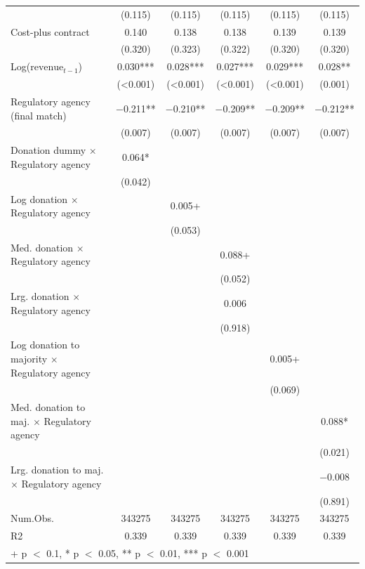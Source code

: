 \begin{table}[H]
{\begin{tabular}[t]{lccccc}
 & (\num{0.115}) & (\num{0.115}) & (\num{0.115}) & (\num{0.115}) & (\num{0.115})\\
Cost-plus contract & \num{0.140} & \num{0.138} & \num{0.138} & \num{0.139} & \num{0.139}\\
 & (\num{0.320}) & (\num{0.323}) & (\num{0.322}) & (\num{0.320}) & (\num{0.320})\\
Log($\text{revenue}_{t-1}$) & \num{0.030}*** & \num{0.028}*** & \num{0.027}*** & \num{0.029}*** & \num{0.028}**\\
 & (\num{<0.001}) & (\num{<0.001}) & (\num{<0.001}) & (\num{<0.001}) & (\num{0.001})\\
Regulatory agency (final match) & \num{-0.211}** & \num{-0.210}** & \num{-0.209}** & \num{-0.209}** & \num{-0.212}**\\
 & (\num{0.007}) & (\num{0.007}) & (\num{0.007}) & (\num{0.007}) & (\num{0.007})\\
Donation dummy $\times$ Regulatory agency & \num{0.064}* &  &  &  & \\
 & (\num{0.042}) &  &  &  & \\
Log donation $\times$ Regulatory agency &  & \num{0.005}+ &  &  & \\
 &  & (\num{0.053}) &  &  & \\
Med. donation $\times$ Regulatory agency &  &  & \num{0.088}+ &  & \\
 &  &  & (\num{0.052}) &  & \\
Lrg. donation $\times$ Regulatory agency &  &  & \num{0.006} &  & \\
 &  &  & (\num{0.918}) &  & \\
Log donation to majority $\times$ Regulatory agency &  &  &  & \num{0.005}+ & \\
 &  &  &  & (\num{0.069}) & \\
Med. donation to maj. $\times$ Regulatory agency &  &  &  &  & \num{0.088}*\\
 &  &  &  &  & (\num{0.021})\\
Lrg. donation to maj. $\times$ Regulatory agency &  &  &  &  & \num{-0.008}\\
 &  &  &  &  & (\num{0.891})\\
\midrule
Num.Obs. & \num{343275} & \num{343275} & \num{343275} & \num{343275} & \num{343275}\\
R2 & \num{0.339} & \num{0.339} & \num{0.339} & \num{0.339} & \num{0.339}\\
\bottomrule
\multicolumn{6}{l}{\rule{0pt}{1em}+ p $<$ 0.1, * p $<$ 0.05, ** p $<$ 0.01, *** p $<$ 0.001}\\
\end{tabular}}
\end{table}
